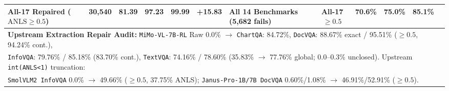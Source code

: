 \documentclass[10pt,twocolumn,letterpaper]{article}
\begin{document}
\begin{table}[t]
{\begin{tabular}{lccccc|lccccc}
All-17 Repaired ($\text{ANLS}\ge 0.5$) & 30,540 & 81.39 & 97.23 & 99.99 & +15.83 & All 14 Benchmarks (5,682 fails) & All-17 $\ge 0.5$ & 70.6\% & 75.0\% & 85.1\% \\
\midrule
\multicolumn{11}{l}{\textbf{Upstream Extraction Repair Audit:} \texttt{MiMo-VL-7B-RL} Raw 0.0\% $\to$ \texttt{ChartQA}: 84.72\%, \texttt{DocVQA}: 88.67\% exact / 95.51\% ($\ge 0.5$, 94.24\% cont.),} \\
\multicolumn{11}{l}{\texttt{InfoVQA}: 79.76\% / 85.18\% (83.70\% cont.), \texttt{TextVQA}: 74.16\% / 78.60\% (35.83\% $\to$ 77.76\% global; 0.0--0.3\% unclosed). Upstream \texttt{int(ANLS<1)} truncation:} \\
\multicolumn{11}{l}{\texttt{SmolVLM2 InfoVQA} 0.0\% $\to$ 49.66\% ($\ge 0.5$, 37.75\% ANLS); \texttt{Janus-Pro-1B/7B DocVQA} 0.60\%/1.08\% $\to$ 46.91\%/52.91\% ($\ge 0.5$).} \\
\bottomrule
\end{tabular}%
}
\end{table}
\end{document}
